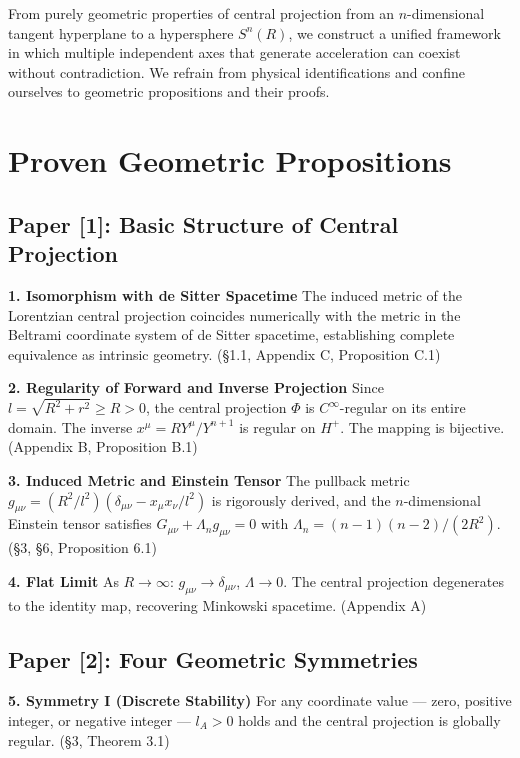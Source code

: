 \documentclass[12pt,a4paper]{article}
\begin{document}
From purely geometric properties of central projection from an $n$-dimensional tangent hyperplane to a hypersphere $S^n(R)$, we construct a unified framework in which multiple independent axes that generate acceleration can coexist without contradiction. We refrain from physical identifications and confine ourselves to geometric propositions and their proofs.

\section*{Proven Geometric Propositions}

\subsection*{Paper [1]: Basic Structure of Central Projection}

\textbf{1. Isomorphism with de Sitter Spacetime}\quad
The induced metric of the Lorentzian central projection coincides numerically with the metric in the Beltrami coordinate system of de Sitter spacetime, establishing complete equivalence as intrinsic geometry. (\S 1.1, Appendix C, Proposition C.1)

\textbf{2. Regularity of Forward and Inverse Projection}\quad
Since $l = \sqrt{R^2 + r^2} \geq R > 0$, the central projection $\Phi$ is $C^\infty$-regular on its entire domain. The inverse $x^\mu = RY^\mu/Y^{n+1}$ is regular on $H^+$. The mapping is bijective. (Appendix B, Proposition B.1)

\textbf{3. Induced Metric and Einstein Tensor}\quad
The pullback metric $g_{\mu\nu} = (R^2/l^2)(\delta_{\mu\nu} - x_\mu x_\nu/l^2)$ is rigorously derived, and the $n$-dimensional Einstein tensor satisfies $G_{\mu\nu} + \Lambda_n g_{\mu\nu} = 0$ with $\Lambda_n = (n{-}1)(n{-}2)/(2R^2)$. (\S 3, \S 6, Proposition 6.1)

\textbf{4. Flat Limit}\quad
As $R \to \infty$: $g_{\mu\nu} \to \delta_{\mu\nu}$, $\Lambda \to 0$. The central projection degenerates to the identity map, recovering Minkowski spacetime. (Appendix A)

\subsection*{Paper [2]: Four Geometric Symmetries}

\textbf{5. Symmetry I (Discrete Stability)}\quad
For any coordinate value --- zero, positive integer, or negative integer --- $l_A > 0$ holds and the central projection is globally regular. (\S 3, Theorem 3.1)
\end{document}
